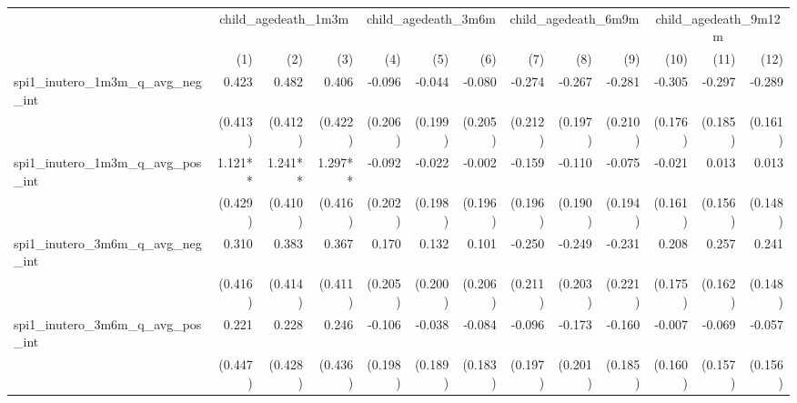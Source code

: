 \begin{tabular}{lrrrrrrrrrrrr}
\toprule
                                            &  \multicolumn{3}{c}{child\_agedeath\_1m3m} &  \multicolumn{3}{c}{child\_agedeath\_3m6m} &  \multicolumn{3}{c}{child\_agedeath\_6m9m} & \multicolumn{3}{c}{child\_agedeath\_9m12m} \\ 
\cmidrule(lr){2-4} \cmidrule(lr){5-7} \cmidrule(lr){8-10} \cmidrule(lr){11-13} 
                                            &          (1) &          (2) &          (3) &          (4) &          (5) &          (6) &          (7) &          (8) &          (9) &         (10) &         (11) &         (12) \\ 
\midrule
spi1\_inutero\_1m3m\_q\_avg\_neg\_int       &        0.423 &        0.482 &        0.406 &       -0.096 &       -0.044 &       -0.080 &       -0.274 &       -0.267 &       -0.281 &       -0.305 &       -0.297 &       -0.289 \\ 
                                            &      (0.413) &      (0.412) &      (0.422) &      (0.206) &      (0.199) &      (0.205) &      (0.212) &      (0.197) &      (0.210) &      (0.176) &      (0.185) &      (0.161) \\ 
spi1\_inutero\_1m3m\_q\_avg\_pos\_int       &      1.121** &      1.241** &      1.297** &       -0.092 &       -0.022 &       -0.002 &       -0.159 &       -0.110 &       -0.075 &       -0.021 &        0.013 &        0.013 \\ 
                                            &      (0.429) &      (0.410) &      (0.416) &      (0.202) &      (0.198) &      (0.196) &      (0.196) &      (0.190) &      (0.194) &      (0.161) &      (0.156) &      (0.148) \\ 
spi1\_inutero\_3m6m\_q\_avg\_neg\_int       &        0.310 &        0.383 &        0.367 &        0.170 &        0.132 &        0.101 &       -0.250 &       -0.249 &       -0.231 &        0.208 &        0.257 &        0.241 \\ 
                                            &      (0.416) &      (0.414) &      (0.411) &      (0.205) &      (0.200) &      (0.206) &      (0.211) &      (0.203) &      (0.221) &      (0.175) &      (0.162) &      (0.148) \\ 
spi1\_inutero\_3m6m\_q\_avg\_pos\_int       &        0.221 &        0.228 &        0.246 &       -0.106 &       -0.038 &       -0.084 &       -0.096 &       -0.173 &       -0.160 &       -0.007 &       -0.069 &       -0.057 \\ 
                                            &      (0.447) &      (0.428) &      (0.436) &      (0.198) &      (0.189) &      (0.183) &      (0.197) &      (0.201) &      (0.185) &      (0.160) &      (0.157) &      (0.156) \\ 

\end{tabular}
